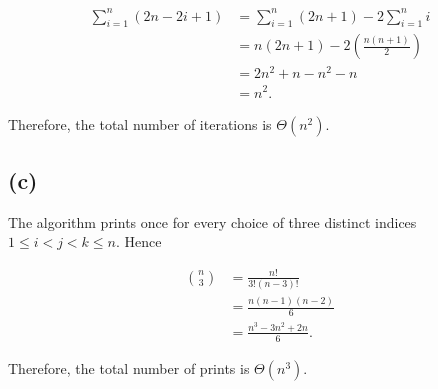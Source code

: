 \documentclass[11pt]{article}
\begin{document}
\begin{align*}

\sum_{i=1}^{n}(2n-2i+1) 

&=\sum_{i=1}^{n}(2n+1)-2\sum_{i=1}^{n}i\\

&=n(2n+1)-2\left(\frac{n(n+1)}{2}\right)\\

&=2n^2+n-n^2-n\\

&=\boxed{n^2}.
\end{align*}

Therefore, the total number of iterations is
$\Theta(n^2)$.

\subsection*{(c)}

The algorithm prints once for every choice of three distinct indices $1\le i<j<k\le n$. Hence

\begin{align*}

\binom{n}{3}

&=\frac{n!}{3!(n-3)!}\\

&=\frac{n(n-1)(n-2)}{6}\\

&=\boxed{\frac{n^3-3n^2+2n}{6}}.
\end{align*}

Therefore, the total number of prints is
$\Theta(n^3)$.
\end{document}
